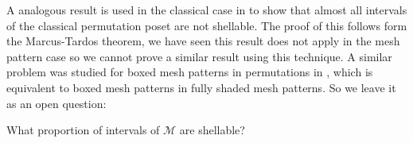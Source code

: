 \documentclass[11pt,a4paper,oneside]{article}
\begin{document}
A analogous result is used in the classical case in \cite{McSt13} to show that
almost all intervals of the classical permutation poset are not shellable. The
proof of this follows form the Marcus-Tardos theorem, we have seen this result
does not apply in the mesh pattern case so we cannot prove a similar result
using this technique.  A similar problem was studied for boxed mesh patterns in
permutations in \cite{AKV13}, which is equivalent to boxed mesh patterns in
fully shaded mesh patterns. So we leave it as an open question:

\begin{que}
What proportion of intervals of $\mathcal{M}$ are shellable?
\end{que}




\end{document}
